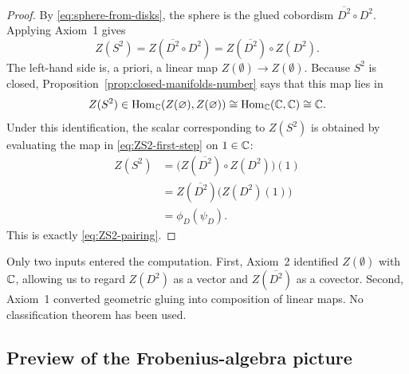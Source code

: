 \begin{proof}
By \eqref{eq:sphere-from-disks}, the sphere is the glued cobordism $\overline{D^2} \circ D^2$. Applying Axiom~1 gives
\begin{equation}\label{eq:ZS2-first-step}
Z(S^2) = Z(\overline{D^2} \circ D^2) = Z(\overline{D^2}) \circ Z(D^2).
\end{equation}
The left-hand side is, a priori, a linear map $Z(\emptyset)\to Z(\emptyset)$. Because $S^2$ is closed, Proposition~\ref{prop:closed-manifolds-number} says that this map lies in
\begin{equation}\label{eq:ZS2-homCC}
Z(S^2) \in \operatorname{Hom}_{\mathbb{C}}(Z(\varnothing), Z(\varnothing)) \cong \operatorname{Hom}_{\mathbb{C}}(\mathbb{C},\mathbb{C}) \cong \mathbb{C}.
\end{equation}
Under this identification, the scalar corresponding to $Z(S^2)$ is obtained by evaluating the map in \eqref{eq:ZS2-first-step} on $1 \in \mathbb{C}$:
\begin{align}
Z(S^2)
&= \bigl(Z(\overline{D^2}) \circ Z(D^2)\bigr)(1) \label{eq:ZS2-evaluate-1} \\
&= Z(\overline{D^2})\bigl(Z(D^2)(1)\bigr) \nonumber \\
&= \phi_D(\psi_D). \nonumber
\end{align}
This is exactly \eqref{eq:ZS2-pairing}.
\end{proof}

\begin{remark}\label{rem:which-axioms-disk-gluing}
Only two inputs entered the computation. First, Axiom~2 identified $Z(\emptyset)$ with $\mathbb{C}$, allowing us to regard $Z(D^2)$ as a vector and $Z(\overline{D^2})$ as a covector. Second, Axiom~1 converted geometric gluing into composition of linear maps. No classification theorem has been used.
\end{remark}

\subsection{Preview of the Frobenius-algebra picture}


